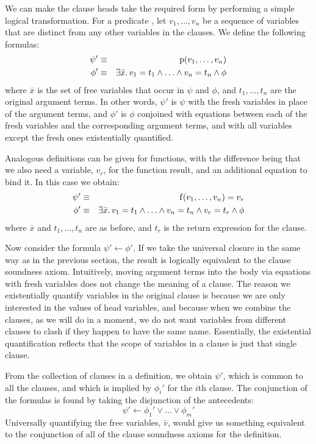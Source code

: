 We can make the clause heads take the required form
by performing a simple logical transformation.
For a predicate ,
let $v_1, \ldots, v_n$ be a sequence of variables
that are distinct from any other variables in the clauses.
We define the following formulas:
\begin{eqnarray*}
\psi' & \equiv & \operatorname{p}(v_1, \ldots, v_n) \\
\phi' & \equiv &
    \exists \bar{x}.\, v_1 = t_1 \land \ldots \land v_n = t_n \land \phi
\end{eqnarray*}
where $\bar{x}$ is the set of free variables
that occur in $\psi$ and $\phi$,
and $t_1, \ldots, t_n$ are the original argument terms.
In other words,
$\psi'$ is $\psi$ with the fresh variables
in place of the argument terms,
and $\phi'$ is $\phi$ conjoined with
equations between each of the fresh variables
and the corresponding argument terms,
and with all variables except the fresh ones existentially quantified.

Analogous definitions can be given for functions,
with the difference being that
we also need a variable, $v_r$, for the function result,
and an additional equation to bind it.
In this case we obtain:
\begin{eqnarray*}
\psi' & \equiv & \operatorname{f}(v_1, \ldots, v_n) = v_r \\
\phi' & \equiv &
    \exists \bar{x}.\, v_1 = t_1 \land \ldots \land v_n = t_n
    \land v_r = t_r \land \phi
\end{eqnarray*}
where $\bar{x}$ and $t_1, \ldots, t_n$ are as before,
and $t_r$ is the return expression for the clause.

Now consider the formula $\psi' \leftarrow \phi'$.
If we take the universal closure
in the same way as in the previous section,
the result is logically equivalent to
the clause soundness axiom.
Intuitively,
moving argument terms into the body
via equations with fresh variables
does not change the meaning of a clause.
The reason we existentially quantify
variables in the original clause
is because we are only interested in
the values of head variables,
and because when we combine the clauses,
as we will do in a moment,
we do not want variables from different clauses
to clash if they happen to have the same name.
Essentially, the existential quantification
reflects that the scope of variables in a clause
is just that single clause.

From the collection of clauses in a definition,
we obtain $\psi'$, which is common to all the clauses,
and which is implied by $\phi_i'$ for the $i$th clause.
The conjunction of the formulas is found by
taking the disjunction of the antecedents:
\[
    \psi' \leftarrow \phi_1' \lor \ldots \lor \phi_m'
\]
Universally quantifying the free variables, $\bar{v}$,
would give us something equivalent to
the conjunction of all of the clause soundness axioms
for the definition.


